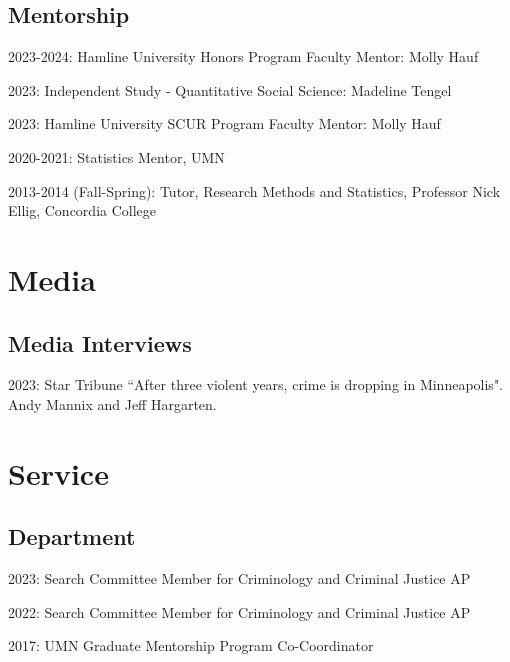 \documentclass[letterpaper]{article}
\renewenvironment{itemize}{
  \begin{list}{}{
    \setlength{\leftmargin}{1.5em}
  }
}{
  \end{list}
}
\begin{document}
\subsection*{Mentorship}
        \begin{itemize}

\item 2023-2024: Hamline University Honors Program Faculty Mentor: Molly Hauf
\item 2023: Independent Study - Quantitative Social Science: Madeline Tengel 
\item 2023: Hamline University SCUR Program Faculty Mentor: Molly Hauf
\item 2020-2021: Statistics Mentor, UMN
    

\item 2013-2014 (Fall-Spring): Tutor, Research Methods and Statistics, Professor Nick Ellig, Concordia College
         \end{itemize}

\section*{\textbf{Media}}

\subsection*{Media Interviews}
\begin{itemize}

\item 2023: Star Tribune ``After three violent years, crime is dropping in Minneapolis". Andy Mannix and Jeff Hargarten.  

\end{itemize}

\section*{\textbf{Service}}

\subsection*{Department}
\begin{itemize}

\item 2023: Search Committee Member for Criminology and Criminal Justice AP
\item 2022: Search Committee Member for Criminology and Criminal Justice AP
\item 2017: UMN Graduate Mentorship Program Co-Coordinator

\end{itemize}
\end{document}
